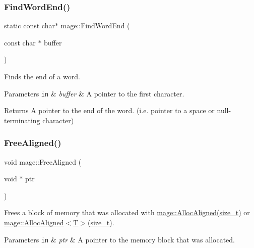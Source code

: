\hypertarget{namespacemage_a81ebde51f9da00dd6fad364a2c5017cb}{}\label{namespacemage_a81ebde51f9da00dd6fad364a2c5017cb} 
\subsubsection{\texorpdfstring{Find\+Word\+End()}{FindWordEnd()}}
{\footnotesize\ttfamily static const char$\ast$ mage\+::\+Find\+Word\+End (\begin{DoxyParamCaption}\item[{const char $\ast$}]{buffer }\end{DoxyParamCaption})\hspace{0.3cm}{\ttfamily [static]}}

Finds the end of a word.


\begin{DoxyParams}[1]{Parameters}
\mbox{\tt in}  & {\em buffer} & A pointer to the first character. \\
\hline
\end{DoxyParams}
\begin{DoxyReturn}{Returns}
A pointer to the end of the word. (i.\+e. pointer to a space or null-\/terminating character) 
\end{DoxyReturn}
\hypertarget{namespacemage_a401c54df21447c491c527735647b5f80}{}\label{namespacemage_a401c54df21447c491c527735647b5f80} 
\subsubsection{\texorpdfstring{Free\+Aligned()}{FreeAligned()}}
{\footnotesize\ttfamily void mage\+::\+Free\+Aligned (\begin{DoxyParamCaption}\item[{void $\ast$}]{ptr }\end{DoxyParamCaption})}

Frees a block of memory that was allocated with \hyperlink{namespacemage_a43e2cdb4c71637a86b1861a73be44a58}{mage\+::\+Alloc\+Aligned(size\+\_\+t)} or \hyperlink{namespacemage_a43e2cdb4c71637a86b1861a73be44a58}{mage\+::\+Alloc\+Aligned$<$\+T$>$(size\+\_\+t)}.


\begin{DoxyParams}[1]{Parameters}
\mbox{\tt in}  & {\em ptr} & A pointer to the memory block that was allocated. \\
\hline
\end{DoxyParams}
\hypertarget{namespacemage_afcc0891e1660f8457696cb30f4ee518a}{}\label{namespacemage_afcc0891e1660f8457696cb30f4ee518a} 
